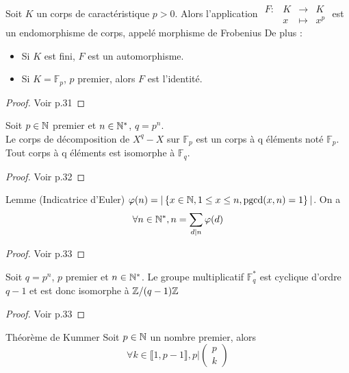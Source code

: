 \documentclass[]{report}
\begin{document}
    \begin{prop}{}{}
        Soit $K$ un corps de caractéristique $p>0$. Alors l'application $\begin{array}{ccccc}
    F : & K & \to & K \\
      & x & \mapsto & x^p
    \end{array}$ est un endomorphisme de corps, appelé morphisme de Frobenius De plus : \begin{itemize}
        \item Si $K$ est fini, $F$ est un automorphisme.
        \item Si $K=\mathbb{F}_p$, $p$ premier, alors $F$ est l'identité.
    \end{itemize}
    \end{prop}

    \begin{proof}
        Voir p.31
    \end{proof}

    \begin{tm}{}{}
        Soit $p \in \mathbb{N}$ premier et $n\in\mathbb{N}^*$, $q=p^n$.\\
        Le corps de décomposition de $X^q-X$ sur $\mathbb{F}_p$ est un corps à q éléments noté $\mathbb{F}_p$. Tout corps à q éléments est isomorphe à $\mathbb{F}_q$.
    \end{tm}

    \begin{proof}
        Voir p.32
    \end{proof}

    \begin{lm}{Lemme (Indicatrice d'Euler)}{}
        $\varphi(n)=| \left\{ x\in\mathbb{N},1\le x\le n,\text{pgcd}(x,n)=1 \right\} |$. On a $$\forall n \in \mathbb{N}^*,n=\sum_{d|n}\varphi(d)$$
    \end{lm}

    \begin{proof}
        Voir p.33
    \end{proof}

    \begin{tm}{}{}
        Soit $q=p^n$, $p$ premier et $n\in\mathbb{N}^*$. Le groupe multiplicatif $\mathbb{F}_q^*$ est cyclique d'ordre $q-1$ et est donc isomorphe à $\mathbb{Z}/(q-1)\mathbb{Z}$
    \end{tm}

    \begin{proof}
        Voir p.33
    \end{proof}

    \begin{tm}{Théorème de Kummer}{}
        Soit $p\in\mathbb{N}$ un nombre premier, alors $$\forall k\in\llbracket 1,p-1\rrbracket,p|\begin{pmatrix}
            p\\
            k
        \end{pmatrix}$$
    \end{tm}
\end{document}
